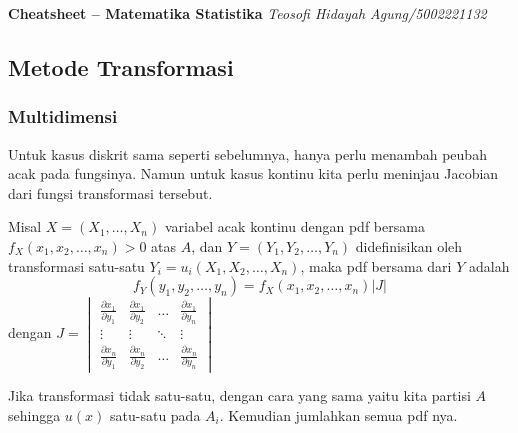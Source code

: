 \documentclass[a4paper,extrafontsizes, 9pt]{memoir}
\begin{document}
\footnotesize \textbf{{Cheatsheet -- Matematika Statistika}} \hfill \textit{Teosofi Hidayah Agung/5002221132}
	\begin{multicols}{3}			
        \subsection*{\small Metode Transformasi}
            \subsubsection*{\small Multidimensi}
                    Untuk kasus diskrit sama seperti sebelumnya, hanya perlu menambah peubah acak pada fungsinya. Namun untuk kasus kontinu kita perlu meninjau Jacobian dari fungsi transformasi tersebut.

                    Misal $X=(X_1,\dots,X_n)$ variabel acak kontinu dengan pdf bersama $f_X(x_1, x_2,\dots, x_n) > 0$ atas $A$, dan $Y = (Y_1, Y_2,\dots, Y_n)$ didefinisikan
                    oleh transformasi satu-satu $Y_i = u_i(X_1,X_2,\dots ,X_n)$, maka pdf bersama dari $Y$ adalah
                    \[f_Y(y_1,y_2,\dots,y_n) = f_X(x_1,x_2,\dots,x_n)\left|J\right|\]
                    dengan $J=\begin{vmatrix}
                        \frac{\partial x_1}{\partial y_1} & \frac{\partial x_1}{\partial y_2} & \dots & \frac{\partial x_1}{\partial y_n}\\
                        \vdots & \vdots & \ddots & \vdots\\
                        \frac{\partial x_n}{\partial y_1} & \frac{\partial x_n}{\partial y_2} & \dots & \frac{\partial x_n}{\partial y_n}
                    \end{vmatrix}$ 
                
                Jika transformasi tidak satu-satu, dengan cara yang sama yaitu kita partisi $A$ sehingga $u(x)$ satu-satu pada $A_i$. Kemudian jumlahkan semua pdf nya.

\end{multicols}
\end{document}
